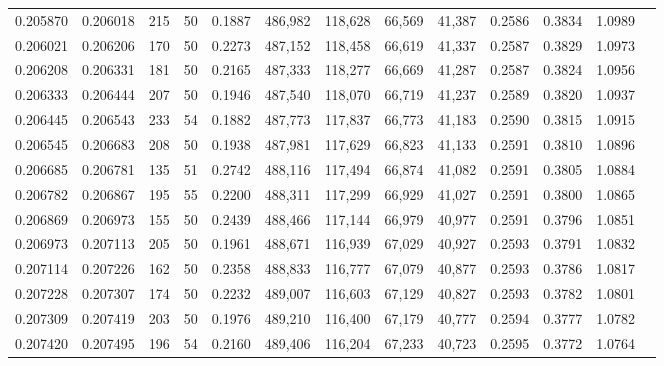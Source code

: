 \begin{tabular}{rrrrrrrrrrrrr}
0.205870 & 0.206018 &   215 &  50 &                                     0.1887 & 486,982 & 118,628 &  66,569 &  41,387 & 0.2586 & 0.3834 & 1.0989 \\
0.206021 & 0.206206 &   170 &  50 &                                     0.2273 & 487,152 & 118,458 &  66,619 &  41,337 & 0.2587 & 0.3829 & 1.0973 \\
0.206208 & 0.206331 &   181 &  50 &                                     0.2165 & 487,333 & 118,277 &  66,669 &  41,287 & 0.2587 & 0.3824 & 1.0956 \\
0.206333 & 0.206444 &   207 &  50 &                                     0.1946 & 487,540 & 118,070 &  66,719 &  41,237 & 0.2589 & 0.3820 & 1.0937 \\
0.206445 & 0.206543 &   233 &  54 &                                     0.1882 & 487,773 & 117,837 &  66,773 &  41,183 & 0.2590 & 0.3815 & 1.0915 \\
0.206545 & 0.206683 &   208 &  50 &                                     0.1938 & 487,981 & 117,629 &  66,823 &  41,133 & 0.2591 & 0.3810 & 1.0896 \\
0.206685 & 0.206781 &   135 &  51 &                                     0.2742 & 488,116 & 117,494 &  66,874 &  41,082 & 0.2591 & 0.3805 & 1.0884 \\
0.206782 & 0.206867 &   195 &  55 &                                     0.2200 & 488,311 & 117,299 &  66,929 &  41,027 & 0.2591 & 0.3800 & 1.0865 \\
0.206869 & 0.206973 &   155 &  50 &                                     0.2439 & 488,466 & 117,144 &  66,979 &  40,977 & 0.2591 & 0.3796 & 1.0851 \\
0.206973 & 0.207113 &   205 &  50 &                                     0.1961 & 488,671 & 116,939 &  67,029 &  40,927 & 0.2593 & 0.3791 & 1.0832 \\
0.207114 & 0.207226 &   162 &  50 &                                     0.2358 & 488,833 & 116,777 &  67,079 &  40,877 & 0.2593 & 0.3786 & 1.0817 \\
0.207228 & 0.207307 &   174 &  50 &                                     0.2232 & 489,007 & 116,603 &  67,129 &  40,827 & 0.2593 & 0.3782 & 1.0801 \\
0.207309 & 0.207419 &   203 &  50 &                                     0.1976 & 489,210 & 116,400 &  67,179 &  40,777 & 0.2594 & 0.3777 & 1.0782 \\
0.207420 & 0.207495 &   196 &  54 &                                     0.2160 & 489,406 & 116,204 &  67,233 &  40,723 & 0.2595 & 0.3772 & 1.0764 \\

\end{tabular}
